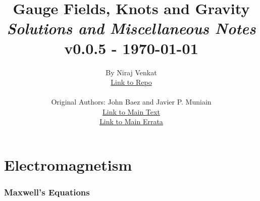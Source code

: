 \documentclass[10pt]{article}
\begin{document}
\nocite{*}

\title{
	Gauge Fields, Knots and Gravity\\
	{\normalsize{\itshape Solutions and Miscellaneous Notes}}\\
	{\normalsize v0.0.5 - \today}
}
\author{
	By Niraj Venkat\\
	\href{https://github.com/nirajvenkat/gfkg-nv}{Link to Repo}\\

	\vspace{2em}
	
	Original Authors: John Baez and Javier P. Muniain\\
	\href{https://doi.org/10.1142/2324}{Link to Main Text}\\
	\href{https://math.ucr.edu/home/baez/errata.html}{Link to Main Errata}
}
\maketitle
\newpage
\pagestyle{fancynotes}


\part{Electromagnetism}


\section{Maxwell's Equations}\label{b1c1}
\end{document}
